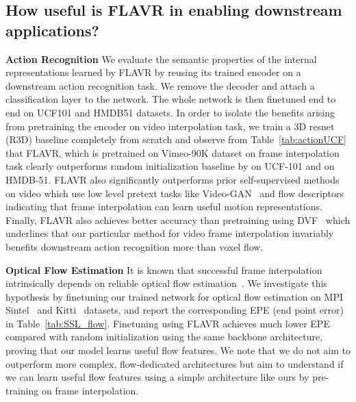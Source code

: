 \documentclass[10pt,twocolumn,letterpaper]{article}
\newcommand{\tabref}[1]{Table~\ref{#1}}
\newcommand{\Ours}{FLAVR}
\begin{document}
\begin{table*}[!t]
\section{How useful is \Ours{} in enabling downstream applications?}
\label{sec:SSL}

{\bf Action Recognition} We evaluate the semantic properties of the internal representations learned by \Ours{} by reusing its trained encoder on a downstream action recognition task. We remove the decoder and attach a classification layer to the network. The whole network is then finetuned end to end on UCF101 and HMDB51 datasets. In order to isolate the benefits arising from pretraining the encoder on video interpolation task, we train a 3D resnet (R3D) baseline completely from scratch and observe from \tabref{tab:actionUCF} that \Ours{}, which is pretrained on Vimeo-90K dataset on frame interpolation task clearly outperforms random initialization baseline by  on UCF-101 and  on HMDB-51. \Ours{} also significantly outperforms prior self-supervised methods on video which use low level pretext tasks like Video-GAN~\cite{vondrick2016generating} and flow descriptors~\cite{luo2017unsupervised} indicating that frame interpolation can learn useful motion representations. 
Finally, \Ours{} also achieves better accuracy than pretraining using DVF~\cite{liu2017video} which underlines that our particular method for video frame interpolation invariably benefits downstream action recognition more than voxel flow. 


{\bf Optical Flow Estimation} It is known that successful frame interpolation intrinsically depends on reliable optical flow estimation~\cite{wulff2018temporal}. We investigate this hypothesis by finetuning our trained network for optical flow estimation on MPI Sintel~\cite{Butler_ECCV_2012} and Kitti~\cite{Geiger2012CVPR, Menze2015CVPR} datasets, and report the corresponding EPE (end point error) in \tabref{tab:SSL_flow}. Finetuning using \Ours{} achieves much lower EPE compared with random initialization using the same backbone architecture, proving that our model learns useful flow features. We note that we do not aim to outperform more complex, flow-dedicated architectures\cite{ilg2017flownet, liu2019selflow} but aim to understand if we can learn useful flow features using a simple architecture like ours by pre-training on frame interpolation.


\end{table*}
\end{document}
